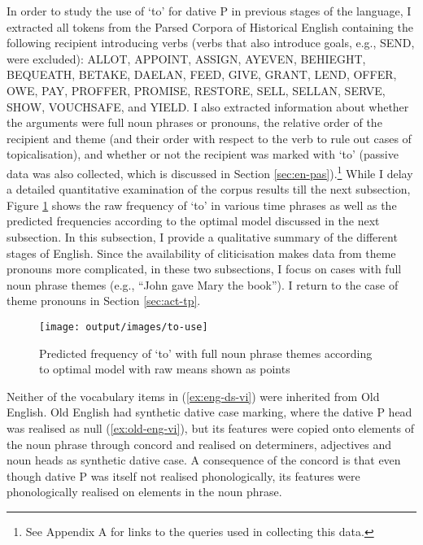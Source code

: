 	In order to study the use of `to' for dative P in previous stages of the language, I extracted all tokens from the Parsed Corpora of Historical English \citep{Kroch.2000,Taylor.2003,Kroch.2004,Taylor.2006,Kroch.2010} containing the following recipient introducing verbs (verbs that also introduce goals, e.g., SEND, were excluded): ALLOT, APPOINT, ASSIGN, AYEVEN, BEHIEGHT, BEQUEATH, BETAKE, DAELAN, FEED, GIVE, GRANT, LEND, OFFER, OWE, PAY, PROFFER, PROMISE, RESTORE, SELL, SELLAN, SERVE, SHOW, VOUCHSAFE, and YIELD. I also extracted information about whether the arguments were full noun phrases or pronouns, the relative order of the recipient and theme (and their order with respect to the verb to rule out cases of topicalisation), and whether or not the recipient was marked with `to' (passive data was also collected, which is discussed in Section \ref{sec:en-pas}).\footnote{See Appendix A for links to the queries used in collecting this data.} While I delay a detailed quantitative examination of the corpus results till the next subsection, Figure \ref{fig:to-use} shows the raw frequency of `to' in various time phrases as well as the predicted frequencies according to the optimal model discussed in the next subsection. In this subsection, I provide a qualitative summary of the different stages of English. Since the availability of cliticisation makes data from theme pronouns more complicated, in these two subsections, I focus on cases with full noun phrase themes (e.g., ``John gave Mary the book''). I return to the case of theme pronouns in Section \ref{sec:act-tp}.

	\begin{figure}[ht!]
		\texttt{[image: output/images/to-use]}
		\caption{Predicted frequency of `to' with full noun phrase themes according to optimal model with raw means shown as points}
		\label{fig:to-use}
	\end{figure}

	Neither of the vocabulary items in (\ref{ex:eng-ds-vi}) were inherited from Old English. Old English had synthetic dative case marking, where the dative P head was realised as null (\ref{ex:old-eng-vi}), but its features were copied onto elements of the noun phrase through concord and realised on determiners, adjectives and noun heads as synthetic dative case. A consequence of the concord is that even though dative P was itself not realised phonologically, its features were phonologically realised on elements in the noun phrase. 
	

